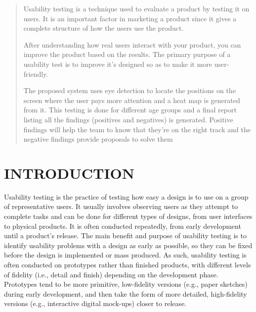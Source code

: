 \documentclass[hidelinks,12pt,a4paper,final]{extreport}
\begin{document}
\begin{quote}
    Usability testing is a technique used to evaluate a product by testing it on users. It is an important factor in marketing a product since it gives a complete structure of how the users use the product.

    After understanding how real users interact with your product, you can improve the product based on the results. The primary purpose of a usability test is to improve it’s designed so as to make it more user-friendly.
    
    The proposed system uses eye detection to locate the positions on the screen where the user pays more attention and a heat map is generated from it. This testing is done for different age groups and a final report listing all the findings (positives and negatives) is generated. Positive findings will help the team to know that they’re on the right track and the negative findings provide proposals to solve them
    


\end{quote}

\newpage
\tableofcontents
{}


\newpage
\listoffigures 
{}

\clearpage
{}
\chead{}
\rhead{}
\cfoot{}
\rfoot{\thepage}
\renewcommand{\headrulewidth}{0.4pt}
\renewcommand{\footrulewidth}{0.4pt}
\pagestyle{fancy}



\chapter{INTRODUCTION}
\vspace{0.3cm}
\noindent
Usability testing is the practice of testing how easy a design is to use on a group of representative users. It usually involves observing users as they attempt to complete tasks and can be done for different types of designs, from user interfaces to physical products. It is often conducted repeatedly, from early development until a product’s release. The main benefit and purpose of usability testing is to identify usability problems with a design as early as possible, so they can be fixed before the design is implemented or mass produced. As such, usability testing is often conducted on prototypes rather than finished products, with different levels of fidelity (i.e., detail and finish) depending on the development phase. Prototypes tend to be more primitive, low-fidelity versions (e.g., paper sketches) during early development, and then take the form of more detailed, high-fidelity versions (e.g., interactive digital mock-ups) closer to release.
\end{document}
